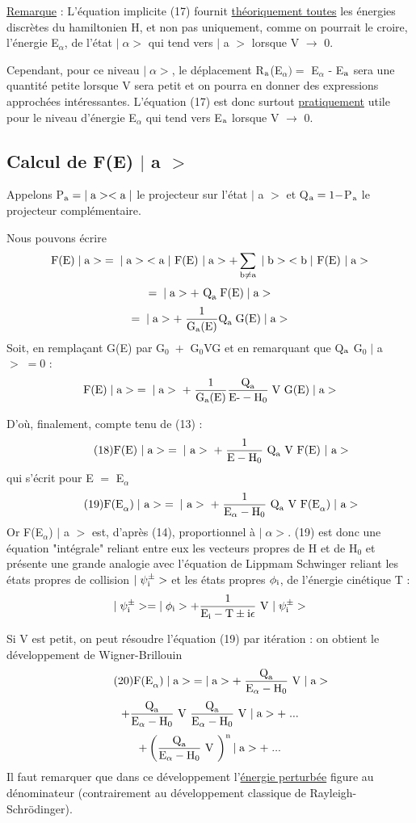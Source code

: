 \ul{Remarque} : L'équation implicite (17) fournit \ul{théoriquement toutes} les énergies
discrètes du hamiltonien H, et non pas uniquement, comme on pourrait le croire,
l'énergie E$_\alpha$, de l'état $|\;\alpha>$ qui tend vers $|$ a $>$ lorsque V $\to$ 0.

Cependant, pour ce niveau $|\;\alpha>$, le déplacement R$_{\text{a}}$(E$_\alpha) =$ E$_\alpha$ - E$_{\text{a}}$
sera une quantité petite lorsque V sera petit et on pourra en donner des
expressions approchées intéressantes. L'équation (17) est donc surtout \ul{pratiquement}
utile pour le niveau d'énergie E$_\alpha$ qui tend vers E$_{\text{a}}$ lorsque V $\to$ 0.
\subsection{Calcul de F(E) $|$ a $>$}%
Appelons P$_{\text{a}}=|\;\text{a}><\text{a}\;|$ le projecteur sur l'état $|$ a $>$ et
Q$_{\text{a}}=1-$P$_{\text{a}}$ le projecteur complémentaire.

Nous pouvons écrire
\[
\text{F(E)}\;|\;\text{a}>\;=\;|\;\text{a}>\;<\text{a}\;|\text{ F(E) }|\;\text{a}>+
\sum_{\text{b}\neq\text{a}}\;|\;\text{b}>\;<\text{b}\;|\text{ F(E) }|\;\text{a}>
\]
\[
=\;|\;\text{a}>+\text{ Q}_{\text{a}}\;\text{F(E)}\;|\;\text{a}>
\]
\[
=\;|\;\text{a}>+\;\frac{1}{\text{G}_{\text{a}}\text{(E)}}\text{Q}_{\text{a}}\;\text{G(E)}\;|\;\text{a}>
\]
Soit, en remplaçant G(E) par G$_0\;+$ G$_0$VG  et en remarquant que Q$_{\text{a}}$ G$_0\;|$ a $>\;=0$ :
\[
\text{F(E)}\;|\;\text{a}>\;=\;|\;\text{a}>\;+\;\frac{1}{\text{G}_{\text{a}}\text{(E)}}
\frac{\text{Q}_{\text{a}}}{\text{E-}-\text{H}_0}\;\text{V G(E)}\;|\;\text{a}>
\]

D'où, finalement, compte tenu de (13) :
\[
\tag{18}\text{F(E) }|\;\text{a}>\;=\;|\text{ a}>\;+\;
\frac{1}{\text{E}-\text{H}_0}\text{ Q}_{\text{a}}\text{ V F(E) }|\text{ a}>
\]
qui s'écrit pour E $=$ E$_\alpha$
\[
\tag{19}\text{F(E}_\alpha)\;|\text{ a}>\;=\;|\text{ a}>\;+\;
\frac{1}{\text{E}_\alpha-\text{H}_0}\text{ Q}_{\text{a}}\text{ V F(E}_\alpha)\;|\text{ a}>
\]
Or F(E$_\alpha$) $|$ a $>$ est, d'après (14), proportionnel à $|\;\alpha>$. (19) est donc une
équation "intégrale" reliant entre eux les vecteurs propres de H et de H$_0$ et
présente une grande analogie avec l'équation de Lippmam Schwinger reliant les
états propres de collision $|\;\psi_{\text{i}}^\pm>$ et les états propres $\phi_{\text{i}}$, de l'énergie cinétique T :
\[
|\;\psi_{\text{i}}^\pm>=|\;\phi_{\text{i}}>+\frac{1}{\text{E}_{\text{i}}-\text{T}\pm\text{i}\epsilon}\text{ V }|\;\psi_{\text{i}}^\pm>
\]

Si V est petit, on peut résoudre l'équation (19) par itération : on obtient
le développement de Wigner-Brillouin
\[
\tag{20}\text{F(E}_\alpha)\;|\;\text{a}>\;=|\;\text{a}>+\;\frac{\text{Q}_{\text{a}}}{\text{E}_\alpha-\text{H}_0}\text{ V }|\;\text{a}>
\]
\[
+\frac{\text{Q}_{\text{a}}}{\text{E}_\alpha-\text{H}_0}\text{ V }
\frac{\text{Q}_{\text{a}}}{\text{E}_\alpha-\text{H}_0}\text{ V }|\;\text{a}>+\;...
\]
\[
+\left(\frac{\text{Q}_{\text{a}}}{\text{E}_\alpha-\text{H}_0}\text{ V }\right)^{\text{n}}|\;\text{a}>+\;...
\]
Il faut remarquer que dans ce développement l'\ul{énergie perturbée} figure au
dénominateur (contrairement au développement classique de Rayleigh-Schrödinger).

